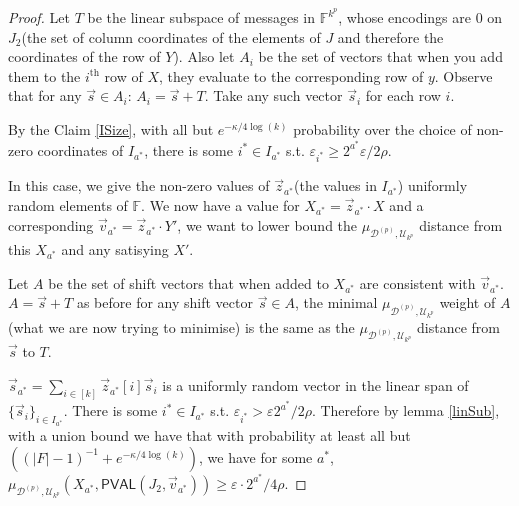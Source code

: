 \documentclass[10pt,a4paper]{article}
\newcommand{\PVAL}{\mathsf{PVAL}}
\begin{document}
\begin{proof}
Let $T$ be the linear subspace of messages in $\mathbb{F}^{k^{p}}$, whose encodings are $0$ on $J_{2}$(the set of column coordinates of the elements of $J$ and therefore the coordinates of the row of $Y$). Also let $A_{i}$ be the set of vectors that when you add them to the $i^{\text{th}}$ row of $X$, they evaluate to the corresponding row of $y$. Observe that for any $\vec{s}\in A_{i}$: $A_{i}=\vec{s}+T$. Take any such vector $\vec{s}_{i}$ for each row $i$.

By the Claim \ref{ISize}, with all but $e^{-\kappa/4\log (k)}$ probability over the choice of non-zero coordinates of $I_{a^{\ast}}$, there is some $i^{\ast}\in I_{a^{\ast}}$ s.t. $\varepsilon_{i^{\ast}}\geq 2^{a^{\ast}}\varepsilon/2\rho$.

In this case, we give the non-zero values of $\vec{z}_{a^{\ast}}$(the values in $I_{a^{\ast}}$) uniformly random elements of $\mathbb{F}$. We now have a value for $X_{a^{\ast}}=\vec{z}_{a^{\ast}}\cdot X$ and a corresponding $\vec{v}_{a^{\ast}}=\vec{z}_{a^{\ast}}\cdot Y'$, we want to lower bound the $\mu_{\mathcal{D}^{(p)},\mathcal{U}_{k^{p}}}$ distance from this $X_{a^{\ast}}$ and any satisying $X'$.

Let $A$ be the set of shift vectors that when added to $X_{a^{\ast}}$ are consistent with $\vec{v}_{a^{\ast}}$. $A=\vec{s}+T$ as before for any shift vector $\vec{s}\in A$, the minimal $\mu_{\mathcal{D}^{(p)},\mathcal{U}_{k^{p}}}$ weight of $A$ (what we are now trying to minimise) is the same as the $\mu_{\mathcal{D}^{(p)},\mathcal{U}_{k^{p}}}$ distance from $\vec{s}$ to $T$.

$\vec{s}_{a^{\ast}}=\sum_{i\in [k]}\vec{z}_{a^{\ast}}[i]\vec{s}_{i}$ is a uniformly random vector in the linear span of $\{\vec{s}_{i}\}_{i\in I_{a^{\ast}}}$. There is some $i^{\ast}\in I_{a^{\ast}}$ s.t. $\varepsilon_{i^{\ast}}>\varepsilon2^{a^{\ast}}/2\rho$. Therefore by lemma \ref{linSub}, with a union bound we have that with probability at least all but $((\vert F\vert -1)^{-1}+e^{-\kappa/4 \log (k)} )$, we have for some $a^{\ast}$, $\mu_{\mathcal{D}^{(p)},\mathcal{U}_{k^{p}}}(X_{a^{\ast}},\PVAL(J_{2},\vec{v}_{a^{\ast}}))\geq \varepsilon\cdot2^{a^{\ast}}/4\rho$.
\end{proof}
\end{document}
